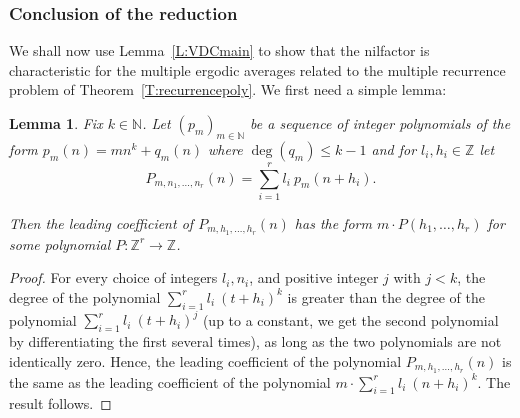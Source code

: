 \documentclass[11pt]{amsart}
\newcommand{\N}{\mathbb{N}}
\newcommand{\Z}{\mathbb{Z}}
\theoremstyle{plain}
\newtheorem{lemma}[theorem]{Lemma}
\theoremstyle{definition}
\theoremstyle{remark}
\begin{document}
\subsubsection{Conclusion of the reduction} We shall now use
Lemma~\ref{L:VDCmain} to show that the nilfactor is characteristic for
the multiple ergodic averages related to the multiple recurrence
problem of Theorem~\ref{T:recurrencepoly}. We first need a simple
lemma:
\begin{lemma}\label{L:leading} Fix $k\in\N$. Let $(p_m)_{m\in\N}$ be a
  sequence of integer polynomials of the form $ p_m(n)=mn^k+q_m(n)$
  where $\deg(q_m)\leq k-1$ and for $l_i, h_i\in\Z$ let
$$
P_{m,n_1,\ldots,n_r}(n)=\sum_{i=1}^r l_i \ \! p_m(n+h_i).
$$

Then the leading coefficient of  $P_{m,h_1,\ldots,h_r}(n)$ has the form
$m \cdot P(h_1,\ldots, h_r)$ for some polynomial $P\colon \Z^r\to \Z$.
\end{lemma}
\begin{proof}
  For every choice of integers $l_i,n_i$, and positive integer $j$
  with $j<k$, the degree of the polynomial $\sum_{i=1}^r l_i \ \!
  (t+h_i)^k$ is greater than the degree of the polynomial
  $\sum_{i=1}^r l_i \ \! (t+h_i)^j$ (up to a constant, we get the
  second polynomial by differentiating the first several times), as
  long as the two polynomials are not identically zero.  Hence, the
  leading coefficient of the polynomial $P_{m,h_1,\ldots,h_r}(n)$ is
  the same as the leading coefficient of the polynomial $ m\cdot
  \sum_{i=1}^r l_i \ \! (n+h_i)^k.  $ The result follows.
\end{proof}
\end{document}
